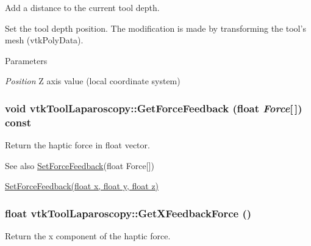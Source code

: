 Add a distance to the current tool depth. 

Set the tool depth position. The modification is made by transforming the tool's mesh (vtkPolyData). 
\begin{DoxyParams}{Parameters}
\item[{\em Position}]Z axis value (local coordinate system) \end{DoxyParams}
\hypertarget{classvtkToolLaparoscopy_abc10b86fce49b9260bb3d43e6a3a0166}{
\subsubsection[{GetForceFeedback}]{\setlength{\rightskip}{0pt plus 5cm}void vtkToolLaparoscopy::GetForceFeedback (float {\em Force}\mbox{[}$\,$\mbox{]}) const}}
\label{classvtkToolLaparoscopy_abc10b86fce49b9260bb3d43e6a3a0166}


Return the haptic force in float vector. 

\begin{DoxySeeAlso}{See also}
\hyperlink{classvtkToolLaparoscopy_a9bbfa040ca224472e6c669a3c27d9977}{SetForceFeedback}(float Force\mbox{[}\mbox{]}) 

\hyperlink{classvtkToolLaparoscopy_aa716d470104640646068eaa160a7adf2}{SetForceFeedback(float x, float y, float z)} 
\end{DoxySeeAlso}
\hypertarget{classvtkToolLaparoscopy_aa891d5e424ce8c57a49b0631dfdfaa93}{
\subsubsection[{GetXFeedbackForce}]{\setlength{\rightskip}{0pt plus 5cm}float vtkToolLaparoscopy::GetXFeedbackForce ()}}
\label{classvtkToolLaparoscopy_aa891d5e424ce8c57a49b0631dfdfaa93}


Return the x component of the haptic force. 

